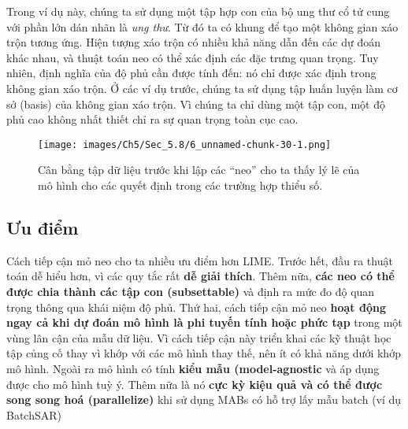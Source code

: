 Trong ví dụ này, chúng ta sử dụng một tập hợp con của bộ ung thư cổ tử cung với phần lớn dán nhãn là \textit{ung thư}. Từ đó ta có khung để tạo một không gian xáo trộn tương ứng. Hiện tượng xáo trộn có nhiều khả năng dẫn đến các dự đoán khác nhau, và thuật toán neo có thể xác định các đặc trưng quan trọng. Tuy nhiên, định nghĩa của độ phủ cần được tính đến: nó chỉ được xác định trong không gian xáo trộn. Ở các ví dụ trước, chúng ta sử dụng tập huấn luyện làm cơ sở (basis) của không gian xáo trộn. Vì chúng ta chỉ dùng một tập con, một độ phủ cao không nhất thiết chỉ ra sự quan trọng toàn cục cao.

\begin{figure*}[h!]
	\centering
	\texttt{[image: images/Ch5/Sec\_5.8/6\_unnamed-chunk-30-1.png]}
	\label{fig:5_42}
	\caption{Cân bằng tập dữ liệu trước khi lập các “neo” cho ta thấy lý lẽ của mô hình cho các quyết định trong các trường hợp thiểu số.}
\end{figure*} 
\subsection{Ưu điểm}
Cách tiếp cận mỏ neo cho ta nhiều ưu điểm hơn LIME. Trước hết, đầu ra thuật toán dễ hiểu hơn, vì các quy tắc rất \textbf{dễ giải thích}.
Thêm nữa, \textbf{các neo có thể được chia thành các tập con (subsettable)} và định ra mức đo độ quan trọng thông qua khái niệm độ phủ. Thứ hai, cách tiếp cận mỏ neo \textbf{hoạt động ngay cả khi dự đoán mô hình là phi tuyến tính hoặc phức tạp} trong một vùng lân cận của mẫu dữ liệu. Vì cách tiếp cận này triển khai các kỹ thuật học tập củng cố thay vì khớp với các mô hình thay thế, nên ít có khả năng dưới khớp mô hình.
Ngoài ra mô hình có tính \textbf{kiểu mẫu (model-agnostic} và áp dụng được cho mô hình tuỳ ý.
Thêm nữa là nó \textbf{cực kỳ kiệu quả và có thể được song song hoá (parallelize)} khi sử dụng MABs có hỗ trợ lấy mẫu batch (ví dụ BatchSAR)

